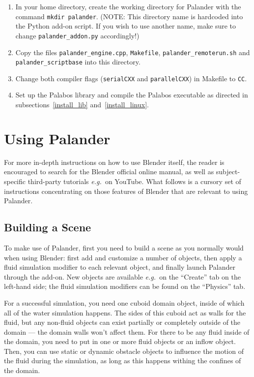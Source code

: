 \documentclass[12pt]{article}
\newcommand{\eg}{\emph{e.g.\ }}
\begin{document}
\begin{enumerate}

\item In your home directory, create the working directory for Palander with the command \verb|mkdir palander|. 
(NOTE: This directory name is hardcoded into the Python add-on script. If you wish to use another name, make 
sure to change \verb|palander_addon.py| accordingly!)
\item Copy the files \verb|palander_engine.cpp|, \verb|Makefile|, \verb|palander_remoterun.sh| and 
\verb|palander_scriptbase| into this directory.
\item Change both compiler flags (\verb|serialCXX| and \verb|parallelCXX|) in Makefile to \verb|CC|.
\item Set up the Palabos library and compile the Palabos executable as directed in 
subsections~\ref{install_lib} and~\ref{install_linux}.
\end{enumerate}

\newpage

\section{Using Palander}

For more in-depth instructions on how to use Blender itself, the reader is encouraged to search for the 
Blender official online manual, as well as subject-specific third-party tutorials \eg on YouTube. What 
follows is a cursory set of instructions concentrating on those features of Blender that are relevant to 
using Palander.

\subsection{Building a Scene}

To make use of Palander, first you need to build a scene as you normally would when using Blender: first add 
and customize a number of objects, then apply a fluid simulation modifier to each relevant object, and 
finally launch Palander through the add-on. New objects are available \eg on the ``Create'' tab on the 
left-hand side; the fluid simulation modifiers can be found on the ``Physics'' tab.

For a successful simulation, you need one cuboid domain object, inside of which all of the water simulation 
happens. The sides of this cuboid act as walls for the fluid, but any non-fluid objects can exist partially 
or completely outside of the domain --- the domain walls won't affect them. For there to be any fluid inside 
of the domain, you need to put in one or more fluid objects or an inflow object. Then, you can use static or 
dynamic obstacle objects to influence the motion of the fluid during the simulation, as long as this happens 
withing the confines of the domain.
\end{document}
